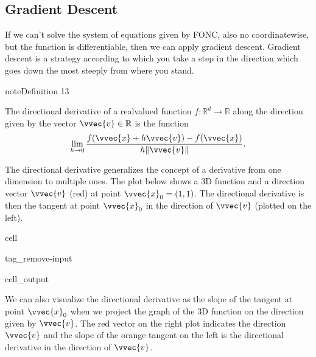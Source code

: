 \documentclass[letterpaper,10pt,english]{jupyterBook}
\begin{document}
\subsection{Gradient Descent}
\label{\detokenize{optimization_numerical:gradient-descent}}
\sphinxAtStartPar
If we can’t solve the system of equations given by FONC, also no coordinate\sphinxhyphen{}wise, but the function is differentiable, then we can apply gradient descent. Gradient descent is a strategy according to which you take a step in the direction which goes down the most steeply from where you stand.
\label{optimization_numerical:definition-2}
\begin{sphinxadmonition}{note}{Definition 13}



\sphinxAtStartPar
The directional derivative of a real\sphinxhyphen{}valued function \(f:\mathbb{R}^d\rightarrow \mathbb{R}\) along the direction given by the vector \(\vvec{v}\in\mathbb{R}\) is the function
\begin{equation*}
\begin{split}\lim_{h\rightarrow 0}\frac{f(\vvec{x}+h\vvec{v})-f(\vvec{x})}{h\lVert\vvec{v}\rVert}.\end{split}
\end{equation*}
\end{sphinxadmonition}

\sphinxAtStartPar
The directional derivative generalizes the concept of a derivative from one dimension to multiple ones. The plot below shows a 3D function and a direction vector \(\vvec{v}\) (red) at point \(\vvec{x}_0=(1,1)\). The directional derivative is then the tangent at point \(\vvec{x}_0\) in the direction of \(\vvec{v}\) (plotted on the left).

\begin{sphinxuseclass}{cell}
\begin{sphinxuseclass}{tag_remove-input}\begin{sphinxVerbatimOutput}

\begin{sphinxuseclass}{cell_output}
\noindent{}

\end{sphinxuseclass}\end{sphinxVerbatimOutput}

\end{sphinxuseclass}
\end{sphinxuseclass}
\sphinxAtStartPar
We can also visualize the directional derivative as the slope of the tangent at point \(\vvec{x}_0\) when we project the graph of the 3D function on the direction given by \(\vvec{v}\). The red vector on the right plot indicates the direction \(\vvec{v}\) and the slope of the orange tangent on the left is the directional derivative in the direction of \(\vvec{v}\).
\end{document}
